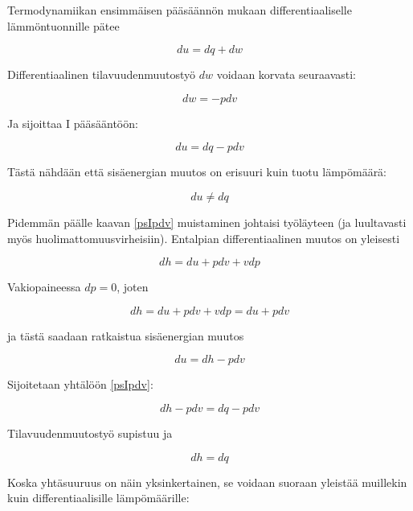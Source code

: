 \documentclass[12pt,a4paper,finnish]{book}
\begin{document}
Termodynamiikan ensimmäisen pääsäännön mukaan differentiaaliselle lämmöntuonnille pätee

\begin{equation}
 du = dq + dw
\end{equation}

Differentiaalinen tilavuudenmuutostyö $dw$ voidaan korvata seuraavasti:

\begin{equation}
 dw = -pdv
\end{equation}

Ja sijoittaa I pääsääntöön:

\begin{equation}
\label{psIpdv}
 du = dq - pdv
\end{equation}

Tästä nähdään että sisäenergian muutos on erisuuri kuin tuotu lämpömäärä:

\begin{equation}
 du \neq dq
\end{equation}

Pidemmän päälle kaavan \ref{psIpdv} muistaminen johtaisi työläyteen (ja luultavasti myös huolimattomuusvirheisiin). Entalpian 
differentiaalinen muutos on yleisesti

\begin{equation}
 dh = du + pdv + vdp
\end{equation}

Vakiopaineessa $dp = 0$, joten

\begin{equation}
 dh = du + pdv + vdp = du + pdv 
\end{equation}

ja tästä saadaan ratkaistua sisäenergian muutos

\begin{equation}
 du = dh - pdv
\end{equation}

Sijoitetaan yhtälöön \ref{psIpdv}:

\begin{equation}
 dh - pdv = dq - pdv
\end{equation}

Tilavuudenmuutostyö supistuu ja

\begin{equation}
 dh = dq
\end{equation}

Koska yhtäsuuruus on näin yksinkertainen, se voidaan suoraan yleistää muillekin kuin differentiaalisille lämpömäärille:
\end{document}
